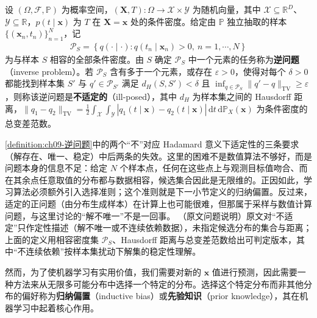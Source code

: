\documentclass[../../main.tex]{subfiles}
\begin{document}
\begin{definition}[逆问题与不适定性]\label{definition:ch09-逆问题}
设 $(\Omega,\mathcal{F},\mathbb{P})$ 为概率空间，$(\boldsymbol{X},T):\Omega\to\mathcal{X}\times\mathcal{Y}$ 为随机向量，其中 $\mathcal{X}\subseteq\mathbb{R}^{D}$、$\mathcal{Y}\subseteq\mathbb{R}$，$p(t\mid\boldsymbol{x})$ 为 $T$ 在 $\boldsymbol{X}=\boldsymbol{x}$ 处的条件密度。给定由 $\mathbb{P}$ 独立抽取的样本 $\{(\boldsymbol{x}_{n},t_{n})\}_{n=1}^{N}$，记
\begin{align*}
\mathcal{P}_{S}=\left\{q(\cdot\mid\cdot):q(t_{n}\mid\boldsymbol{x}_{n})>0,\ n=1,\cdots,N\right\}
\end{align*}
为与样本 $S$ 相容的全部条件密度。由 $S$ 确定 $\mathcal{P}_{S}$ 中一个元素的任务称为\textbf{逆问题}（inverse problem）。若 $\mathcal{P}_{S}$ 含有多于一个元素，或存在 $\varepsilon>0$，使得对每个 $\delta>0$ 都能找到样本集 $S'$ 与 $q'\in\mathcal{P}_{S'}$ 满足 $d_{H}(S,S')<\delta$ 且 $\inf_{q\in\mathcal{P}_{S}}\|q'-q\|_{\mathrm{TV}}\geqslant\varepsilon$，则称该逆问题是\textbf{不适定的}（ill-posed），其中 $d_{H}$ 为样本集之间的 Hausdorff 距离，$\|q_{1}-q_{2}\|_{\mathrm{TV}}=\frac{1}{2}\int_{\mathcal{X}}\int_{\mathcal{Y}}|q_{1}(t\mid\boldsymbol{x})-q_{2}(t\mid\boldsymbol{x})|\,\mathrm{d}t\,\mathrm{d}\mathbb{P}_{X}(\boldsymbol{x})$ 为条件密度的总变差范数。
\end{definition}

\begin{remark}\cref{definition:ch09-逆问题}中的两个“不”对应 Hadamard 意义下适定性的三条要求（解存在、唯一、稳定）中后两条的失效。这里的困难不是数值算法不够好，而是问题本身的信息不足：给定 $N$ 个样本点，任何在这些点上与观测目标值吻合、而在其余点任意取值的分布都与数据相容，候选集合因此是无限维的。正因如此，学习算法必须额外引入选择准则；这个准则就是下一小节定义的归纳偏置。反过来，适定的正问题（由分布生成样本）在计算上也可能很难，但那属于采样与数值计算问题，与这里讨论的“解不唯一”不是一回事。
（原文问题说明）原文对“不适定”只作定性描述（解不唯一或不连续依赖数据），未指定候选分布的集合与距离；上面的定义用相容密度集 $\mathcal{P}_{S}$、Hausdorff 距离与总变差范数给出可判定版本，其中“不连续依赖”按样本集扰动下解集的稳定性理解。
\end{remark}

然而，为了使机器学习有实用价值，我们需要对新的 $\boldsymbol{x}$ 值进行预测，因此需要一种方法来从无限多可能分布中选择一个特定的分布。选择这个特定分布而非其他分布的偏好称为\textbf{归纳偏置}（inductive bias）或\textbf{先验知识}（prior knowledge），其在机器学习中起着核心作用。
\end{document}
